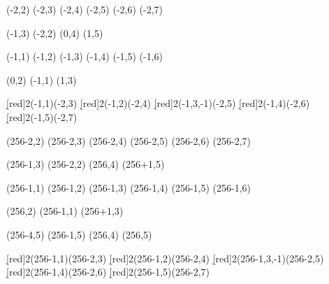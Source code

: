 
\begin{sseqdata}[ name = thetaASS, xscale=1.25, yscale=1.25, x range = {-5}{0}, y range = {0}{5}, x tick step = 2, y tick step = 2, class labels = {left}, classes = fill, grid = crossword, Adams grading, lax degree]

  \class["h_j^2"](-2,2)
  \class(-2,3) \structline
  \class(-2,4) \structline
  \class(-2,5) \structline
  \class(-2,6) \structline
  \class(-2,7) \structline

  \class(-1,3) \structline(-2,2)
  \class(0,4) \structline
  \class(1,5) \structline 
  
  \class["h_{j+1}"](-1,1)
  \class(-1,2) \structline
  \class(-1,3) \structline
  \class(-1,4) \structline
  \class(-1,5) \structline
  \class(-1,6) \structline

  \class(0,2) \structline(-1,1)
  \class(1,3) \structline

  \d[red]2(-1,1)(-2,3)
  \d[red]2(-1,2)(-2,4)
  \d[red]2(-1,3,-1)(-2,5)
  \d[red]2(-1,4)(-2,6)
  \d[red]2(-1,5)(-2,7)
  
\end{sseqdata}

\begin{sseqdata}[ name = theta7ASS, xscale=1.0, yscale=1.0, x range = {251}{256}, y range = {0}{5}, x tick step = 2, y tick step = 2, class labels = {left}, classes = fill, grid = crossword, Adams grading, lax degree]

  \class["h_7^2"](256-2,2)
  \class(256-2,3) \structline
  \class(256-2,4) \structline
  \class(256-2,5) \structline
  \class(256-2,6) \structline
  \class(256-2,7) \structline

  \class(256-1,3) \structline(256-2,2)
  \class(256,4) \structline
  \class(256+1,5) \structline 
  
  \class["h_{8}"](256-1,1)
  \class(256-1,2) \structline
  \class(256-1,3) \structline
  \class(256-1,4) \structline
  \class(256-1,5) \structline
  \class(256-1,6) \structline

  \class(256,2) \structline(256-1,1)
  \class(256+1,3) \structline

  \class["V_0'" below](256-4,5)
  \class["K_1" below](256-1,5)
  \class["D_3(2)" below](256,4)
  \class(256,5) \structline

  \d[red]2(256-1,1)(256-2,3)
  \d[red]2(256-1,2)(256-2,4)
  \d[red]2(256-1,3,-1)(256-2,5)
  \d[red]2(256-1,4)(256-2,6)
  \d[red]2(256-1,5)(256-2,7)
  
\end{sseqdata}

